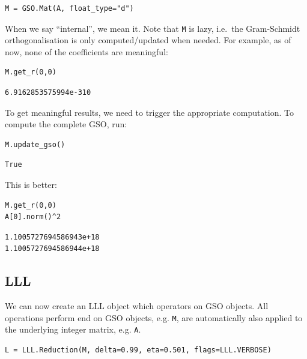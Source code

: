 \documentclass[10pt,a4paper]{tufte-handout}
\begin{document}
\lstset{language=sage,label= ,caption= ,captionpos=b,numbers=none}
\begin{lstlisting}
M = GSO.Mat(A, float_type="d")
\end{lstlisting}

When we say “internal”, we mean it. Note that \texttt{M} is lazy, i.e. the Gram-Schmidt orthogonalisation is only computed/updated when needed. For example, as of now, none of the coefficients are meaningful:

\lstset{language=sage,label= ,caption= ,captionpos=b,numbers=none}
\begin{lstlisting}
M.get_r(0,0)
\end{lstlisting}

\begin{verbatim}
6.9162853575994e-310
\end{verbatim}

To get meaningful results, we need to trigger the appropriate computation. To compute the complete GSO, run:

\lstset{language=sage,label= ,caption= ,captionpos=b,numbers=none}
\begin{lstlisting}
M.update_gso()
\end{lstlisting}

\begin{verbatim}
True
\end{verbatim}

This is better:

\lstset{language=sage,label= ,caption= ,captionpos=b,numbers=none}
\begin{lstlisting}
M.get_r(0,0)
A[0].norm()^2
\end{lstlisting}

\begin{verbatim}
1.1005727694586943e+18
1.1005727694586944e+18
\end{verbatim}

\subsection{LLL}
\label{sec:org5128242}

We can now create an LLL object which operators on GSO objects. All operations perform end on GSO objects, e.g. \texttt{M}, are automatically also applied to the underlying integer matrix, e.g. \texttt{A}.

\lstset{language=sage,label= ,caption= ,captionpos=b,numbers=none}
\begin{lstlisting}
L = LLL.Reduction(M, delta=0.99, eta=0.501, flags=LLL.VERBOSE)
\end{lstlisting}
\end{document}
